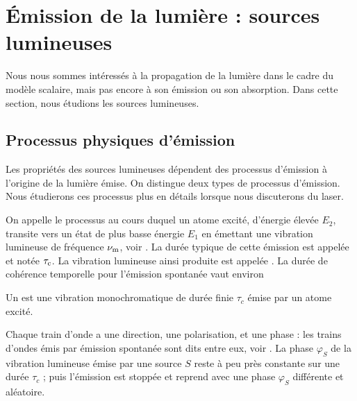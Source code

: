 \documentclass[12pt,fancy]{cours}
\begin{document}
\section{Émission de la lumière : sources lumineuses}

Nous nous sommes intéressés à la propagation de la lumière dans le cadre du modèle scalaire, mais pas encore à son émission ou son absorption. Dans cette section, nous étudions les sources lumineuses.



\subsection{Processus physiques d’émission}
\label{sec:processus_emission}
Les propriétés des sources lumineuses dépendent des processus d’émission à l’origine de la lumière émise. On distingue deux types de processus d’émission. Nous étudierons ces processus plus en détails lorsque nous discuterons du laser.

  On appelle  le processus au cours duquel un atome excité, d'énergie élevée $E_2$, transite vers un état de plus basse énergie $E_1$ en émettant une vibration lumineuse de fréquence $\nu_{\rm m}$, voir . La durée typique de cette émission est appelée  et notée $\tau_{\rm{c}}$. La vibration lumineuse ainsi produite est appelée . La durée de cohérence temporelle pour l’émission spontanée vaut environ

  \begin{definition}\label{def:}
    Un  est une vibration monochromatique de durée finie $\tau_c$ émise par un atome excité. 
  \end{definition}

  Chaque train d’onde a une direction, une polarisation, et une phase  : les trains d'ondes émis par émission spontanée sont dits  entre eux, voir . La phase $\varphi_S$ de la vibration lumineuse émise par une source $S$ reste à peu près constante sur une durée $\tau_c$ ; puis l’émission est stoppée et reprend avec une phase $\varphi_S$ différente et aléatoire.
\end{document}
